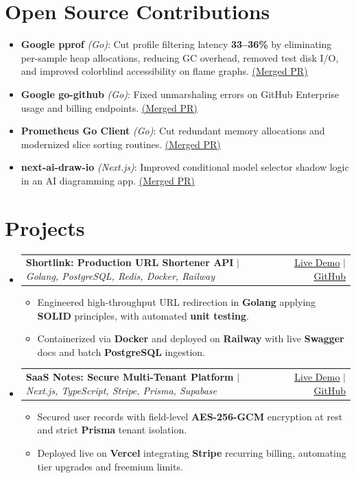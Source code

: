 \documentclass[letterpaper,11pt]{article}
\makeatletter
\newcommand{\resumeItem}[1]{\item\small{#1}}
\newcommand{\resumeProjectHeading}[2]{
  \item
    \begin{tabular*}{\textwidth}{l@{\extracolsep{\fill}}r}
      \small#1 & #2 \\
    \end{tabular*}\vspace{-1.8pt}
}
\newcommand{\resumeSubHeadingListStart}{\begin{itemize}[leftmargin=0in, label={}, itemsep=0.3pt, parsep=0pt, topsep=0.1pt]}
\newcommand{\resumeSubHeadingListEnd}{\end{itemize}\vspace{-2.5pt}}
\newcommand{\resumeItemListStart}{\begin{itemize}[leftmargin=15pt, label=\tiny$\bullet$, itemsep=0.35pt, parsep=0pt, topsep=0.15pt]}
\newcommand{\resumeItemListEnd}{\end{itemize}}
\makeatother
\begin{document}
\section{Open Source Contributions}
  \begin{itemize}[leftmargin=15pt, label=\tiny$\bullet$, itemsep=0.3pt, parsep=0pt, topsep=0.1pt]
    \resumeItem{\textbf{Google pprof} \emph{(Go)}: Cut profile filtering latency \textbf{33--36\%} by eliminating per-sample heap allocations, reducing GC overhead, removed test disk I/O, and improved colorblind accessibility on flame graphs. \href{https://github.com/google/pprof/pulls?q=author:kyyril}{\underline{(Merged PR)}}}
    \resumeItem{\textbf{Google go-github} \emph{(Go)}: Fixed unmarshaling errors on GitHub Enterprise usage and billing endpoints. \href{https://github.com/google/go-github/pull/4002}{\underline{(Merged PR)}}}
    \resumeItem{\textbf{Prometheus Go Client} \emph{(Go)}: Cut redundant memory allocations and modernized slice sorting routines. \href{https://github.com/prometheus/client_golang/pull/2176}{\underline{(Merged PR)}}}
    \resumeItem{\textbf{next-ai-draw-io} \emph{(Next.js)}: Improved conditional model selector shadow logic in an AI diagramming app. \href{https://github.com/DayuanJiang/next-ai-draw-io/pull/681}{\underline{(Merged PR)}}}
  \end{itemize}\vspace{-3pt}

\section[Projects]{Projects \hfill \normalfont\footnotesize{}}
    \resumeSubHeadingListStart
      \resumeProjectHeading
          {\textbf{Shortlink: Production URL Shortener API} $|$ \emph{Golang, PostgreSQL, Redis, Docker, Railway}}{{\href{https://shortlink-production-1c53.up.railway.app/docs}{\underline{Live Demo}}} $|$ {\href{https://github.com/kyyril/shortlink}{\underline{GitHub}}}}
          \resumeItemListStart
            \resumeItem{Engineered high-throughput URL redirection in \textbf{Golang} applying \textbf{SOLID} principles, with automated \textbf{unit testing}.}
            \resumeItem{Containerized via \textbf{Docker} and deployed on \textbf{Railway} with live \textbf{Swagger} docs and batch \textbf{PostgreSQL} ingestion.}
          \resumeItemListEnd
      \resumeProjectHeading
          {\textbf{SaaS Notes: Secure Multi-Tenant Platform} $|$ \emph{Next.js, TypeScript, Stripe, Prisma, Supabase}}{{\href{https://saas-noteapp.vercel.app/}{\underline{Live Demo}}} $|$ {\href{https://github.com/kyyril/saas-noteapp}{\underline{GitHub}}}}
          \resumeItemListStart
            \resumeItem{Secured user records with field-level \textbf{AES-256-GCM} encryption at rest and strict \textbf{Prisma} tenant isolation.}
            \resumeItem{Deployed live on \textbf{Vercel} integrating \textbf{Stripe} recurring billing, automating tier upgrades and freemium limits.}
          \resumeItemListEnd
    \resumeSubHeadingListEnd
\end{document}
